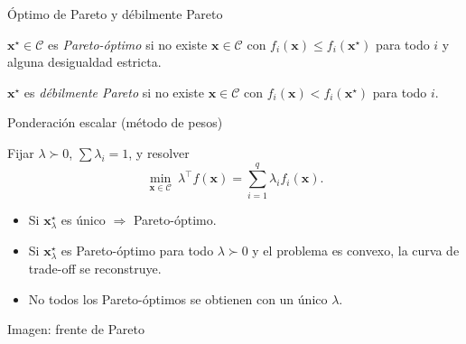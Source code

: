 \documentclass[10pt,aspectratio=169]{beamer}
\newcommand{\x}{\mathbf{x}}
\newcommand{\0}{\mathbf{0}}
\begin{document}
\begin{frame}{Óptimo de Pareto y débilmente Pareto}
  \begin{definition}
    $\x^\star\in\mathcal{C}$ es \emph{Pareto-óptimo} si no existe
    $\x\in\mathcal{C}$ con $f_i(\x)\le f_i(\x^\star)$ para todo $i$ y
    alguna desigualdad estricta.
  \end{definition}
  \begin{definition}[Débil]
    $\x^\star$ es \emph{débilmente Pareto} si no existe
    $\x\in\mathcal{C}$ con $f_i(\x)<f_i(\x^\star)$ para todo $i$.
  \end{definition}
\end{frame}

\begin{frame}{Ponderación escalar (método de pesos)}
  \begin{block}{}
    Fijar $\lambda\succ 0$, $\sum\lambda_i=1$, y resolver
    \[
      \min_{\x\in\mathcal{C}}\ \lambda^\top f(\x)
        =\sum_{i=1}^{q}\lambda_i f_i(\x).
    \]
  \end{block}
  \begin{itemize}
    \item Si $\x^\star_\lambda$ es único $\Rightarrow$ Pareto-óptimo.
    \item Si $\x^\star_\lambda$ es Pareto-óptimo para todo $\lambda\succ 0$
      y el problema es convexo, la curva de trade-off se reconstruye.
    \item No todos los Pareto-óptimos se obtienen con un único $\lambda$.
  \end{itemize}
\end{frame}

\begin{frame}{Imagen: frente de Pareto}
  \centering
\end{frame}
\end{document}
